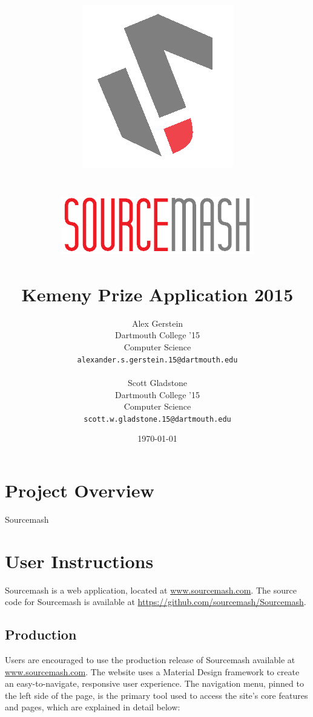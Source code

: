 \documentclass[11pt]{article}
\title{\includegraphics[scale=0.65]{solologo} \\~\\ \includegraphics[scale=0.75]{logotext} \\~\\ Kemeny Prize Application 2015}
\author{
	Alex Gerstein \\ Dartmouth College '15 \\ Computer Science \\ \texttt{alexander.s.gerstein.15@dartmouth.edu}
	\\ \\
	Scott Gladstone \\ Dartmouth College '15 \\ Computer Science \\ \texttt{scott.w.gladstone.15@dartmouth.edu}
	}
\date{\today}
\begin{document}
\maketitle


\pagebreak
\section{Project Overview}

Sourcemash


\section{User Instructions}

Sourcemash is a web application, located at \url{www.sourcemash.com}. The source code for Sourcemash is available at \url{https://github.com/sourcemash/Sourcemash}.

\subsection{Production}

Users are encouraged to use the production release of Sourcemash available at \url{www.sourcemash.com}. The website uses a Material Design framework\cite{Materialize} to create an easy-to-navigate, responsive user experience. The navigation menu, pinned to the left side of the page, is the primary tool used to access the site's core features and pages, which are explained in detail below:
\end{document}
